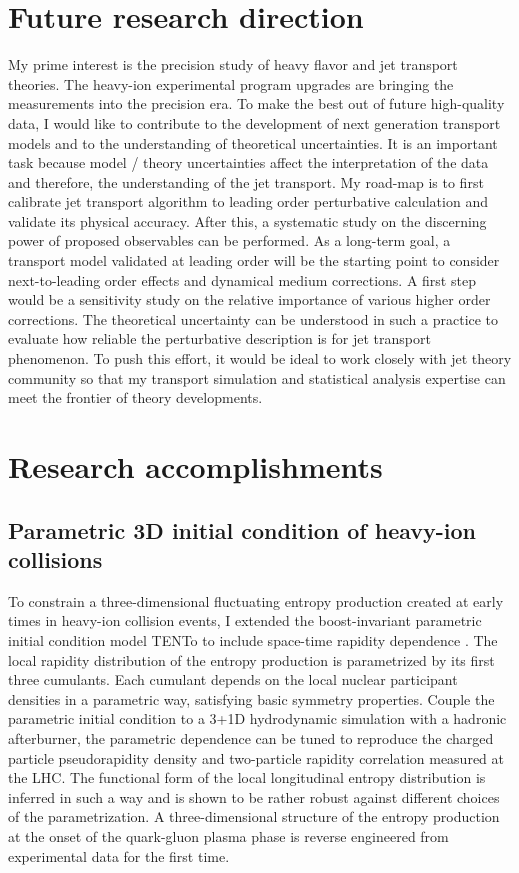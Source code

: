 \documentclass[12pt,a4paper]{revtex4-1}
\begin{document}
\section*{Future research direction}
My prime interest is the precision study of heavy flavor and jet transport theories. 
The heavy-ion experimental program upgrades are bringing the measurements into the precision era. 
To make the best out of future high-quality data, I would like to contribute to the development of next generation transport models and to the understanding of theoretical uncertainties.
It is an important task because model / theory uncertainties affect the interpretation of the data and therefore, the understanding of the jet transport.
My road-map is to first calibrate jet transport algorithm to leading order perturbative calculation and validate its physical accuracy. 
After this, a systematic study on the discerning power of proposed observables can be performed.
As a long-term goal, a transport model validated at leading order will be the starting point to consider next-to-leading order effects and dynamical medium corrections.
A first step would be a sensitivity study on the relative importance of various higher order corrections.
The theoretical uncertainty can be understood in such a practice to evaluate how reliable the perturbative description is for jet transport phenomenon.
To push this effort, it would be ideal to work closely with jet theory community so that my transport simulation and statistical analysis expertise can meet the frontier of theory developments. 

\section*{Research accomplishments}
\subsection*{Parametric 3D initial condition of heavy-ion collisions}
To constrain a three-dimensional fluctuating entropy production created at early times in heavy-ion collision events, I extended the boost-invariant parametric initial condition model TENTo \cite{Moreland:2014oya} to include space-time rapidity dependence \cite{Ke:2016jrd}. 
The local rapidity distribution of the entropy production is parametrized by its first three cumulants. 
Each cumulant depends on the local nuclear participant densities in a parametric way, satisfying basic symmetry properties.
Couple the parametric initial condition to a 3+1D hydrodynamic simulation with a hadronic afterburner, the parametric dependence can be tuned to reproduce the charged particle pseudorapidity density and two-particle rapidity correlation measured at the LHC. 
The functional form of the local longitudinal entropy distribution is inferred in such a way and is shown to be rather robust against different choices of the parametrization.
A three-dimensional structure of the entropy production at the onset of the quark-gluon plasma phase is reverse engineered from experimental data for the first time.   
\end{document}
